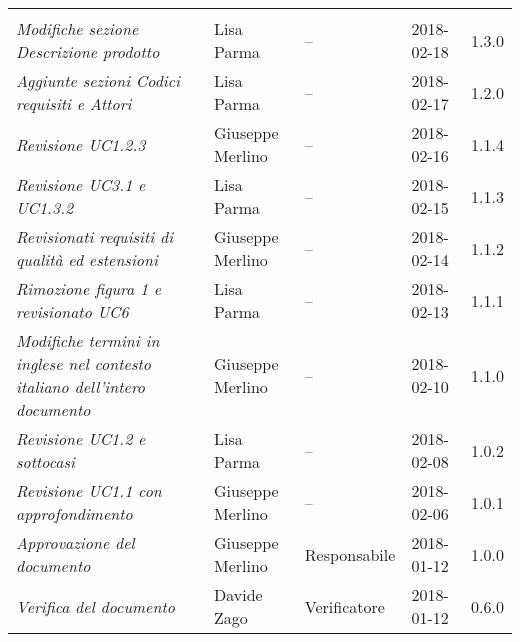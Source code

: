 \newpage 
\section*{}
\begin{table}[H]
	\centering
	\begin{tabular}{p{4cm}|C{3cm}|C{3cm}|R{2.5cm}|R{2cm}}
		
		 & & & & \\
		
		\emph{Modifiche sezione Descrizione prodotto} & Lisa Parma & -- & 2018-02-18 & 1.3.0 \\
		\hline
		
		\emph{Aggiunte sezioni Codici requisiti e Attori} & Lisa Parma & -- & 2018-02-17 & 1.2.0 \\
		\hline
		
		\emph{Revisione  UC1.2.3 }& Giuseppe Merlino & -- & 2018-02-16 & 1.1.4 \\
		\hline
		
		\emph{Revisione UC3.1 e UC1.3.2}& Lisa Parma & -- & 2018-02-15 & 1.1.3 \\
		\hline
		
		\emph{Revisionati requisiti di qualità ed estensioni}&Giuseppe Merlino & -- & 2018-02-14 & 1.1.2 \\
		\hline
		
		\emph{Rimozione figura 1 e revisionato UC6}& Lisa Parma & -- & 2018-02-13 & 1.1.1 \\
		\hline
		
		\emph{Modifiche termini in inglese nel contesto italiano dell'intero documento}& Giuseppe Merlino & -- & 2018-02-10 & 1.1.0 \\
		\hline
		
		\emph{Revisione UC1.2 e sottocasi}& Lisa Parma & -- & 2018-02-08 & 1.0.2 \\
		\hline
		
		\emph{Revisione UC1.1 con approfondimento}& Giuseppe Merlino & -- & 2018-02-06 & 1.0.1 \\
		\hline
		
		\emph{Approvazione del documento}& Giuseppe Merlino & Responsabile & 2018-01-12 & 1.0.0 \\
		\hline
		
		\emph{Verifica del documento}& Davide Zago & Verificatore & 2018-01-12 & 0.6.0 \\
		\hline
		

\end{tabular}
\end{table}
